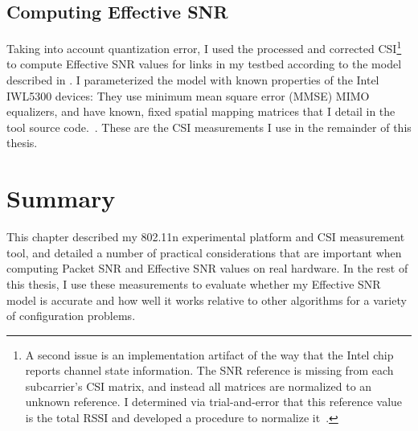 \subsection{Computing Effective SNR}
Taking into account quantization error, I used the processed and corrected CSI\footnote{A second issue is an implementation artifact of the way that the Intel chip reports channel state information. The SNR reference is missing from each subcarrier's CSI matrix, and instead all matrices are normalized to an unknown reference. I determined via trial-and-error that this reference value is the total RSSI and developed a procedure to normalize it~\cite[\texttt{matlab/get\_scaled\_csi.m}]{csitool_code}.} to compute Effective SNR values for links in my testbed according to the model described in . I parameterized the model with known properties of the Intel IWL5300 devices: They use minimum mean square error (MMSE) MIMO equalizers, and have known, fixed spatial mapping matrices that I detail in the tool source code.~\cite[\texttt{matlab/sm\_matrices.m}]{csitool_code}. These are the CSI measurements I use in the remainder of this thesis.

\section{Summary}
This chapter described my 802.11n experimental platform and CSI measurement tool, and detailed a number of practical considerations that are important when computing Packet SNR and Effective SNR values on real hardware. In the rest of this thesis, I use these measurements to evaluate whether my Effective SNR model is accurate and how well it works relative to other algorithms for a variety of configuration problems.

\ifx\mainfile\undefined

\fi